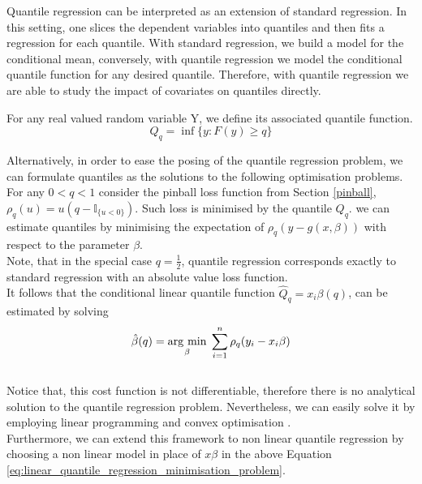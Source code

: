Quantile regression can be interpreted as an extension of standard regression. In this setting, one slices the dependent variables into quantiles and then fits a regression for each quantile. With standard regression, we build a model for the conditional mean, conversely, with quantile regression we model the conditional quantile function for any desired quantile. 
Therefore, with quantile regression we are able to study the impact of covariates on quantiles directly.
\begin{definition}
    For any real valued random variable Y, we define its associated quantile function.
    \begin{equation}
        Q_q=\inf\{y:F(y)\geq q\}
    \end{equation}
\end{definition}
Alternatively, in order  to ease the posing of the quantile regression problem, we can formulate quantiles as the solutions to the following optimisation problems.
\\
For any $0<q<1$ consider the pinball loss function from Section \ref{pinball}, $\rho_q(u)=u(q-\mathbb{I}_{\{u<0\}})$. 
Such loss is minimised by the quantile $Q_q$.
 we can estimate quantiles by minimising the expectation of $\rho_q(y-g(x,\beta))$ with respect to the parameter $\beta$.
\\
Note, that in the special case $q=\frac{1}{2}$,  quantile regression corresponds exactly to standard regression with an absolute value loss function.
\\
It follows that the conditional linear quantile function $\hat{Q}_q=x_i\beta(q)$, can be estimated by solving
\begin{equation}\label{eq:linear_quantile_regression_minimisation_problem}
    \hat{\beta}(q)=\underset{\beta}{\operatorname{arg}\,\operatorname{min}}\;\sum\limits_{i=1}^n \rho_q   (y_i-x_i \beta)
\end{equation}
\\
Notice that, this cost function is not differentiable, therefore there is no analytical solution to the quantile regression problem. Nevertheless, we can easily solve it by employing linear programming and convex optimisation \cite{boyd2004convex}.
\\
Furthermore, we can extend this framework to non linear quantile regression by choosing a non linear model in place of $x\beta$ in the above Equation \ref{eq:linear_quantile_regression_minimisation_problem}.
